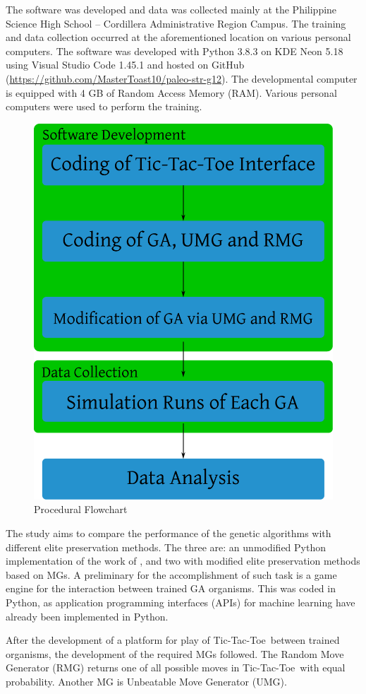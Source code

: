 \documentclass{strrespaper-journ}
\newcommand{\ttt}{Tic-Tac-Toe}
\begin{document}
		The software was developed and data was collected mainly at the Philippine Science High School -- Cordillera Administrative Region Campus.
		The training and data collection occurred at the aforementioned location on various personal computers.
		The software was developed with Python 3.8.3 on KDE Neon 5.18 using Visual Studio Code 1.45.1 and hosted on GitHub (\url{https://github.com/MasterToast10/paleo-str-g12}).
		The developmental computer is equipped with 4 GB of Random Access Memory (RAM).
		Various personal computers were used to perform the training.

		\begin{figure}[htbp]
			\centering
			\includegraphics[width=0.5\linewidth]{../figures/procedural_flowchart}
			\caption{Procedural Flowchart}
			\label{fig:proc_flowchart}
		\end{figure}

		The study aims to compare the performance of the genetic algorithms with different elite preservation methods.
		The three are: an unmodified Python implementation of the work of \textcite{bhattSearchNolossStrategies2008}, and two with modified elite preservation methods based on MGs.
		A preliminary for the accomplishment of such task is a game engine for the interaction between trained GA organisms.
		This was coded in Python, as application programming interfaces (APIs) for machine learning have already been implemented in Python.

		After the development of a platform for play of \ttt\ between trained organisms, the development of the required MGs followed.
		The Random Move Generator (RMG) returns one of all possible moves in \ttt\ with equal probability.
		Another MG is Unbeatable Move Generator (UMG).
\end{document}
